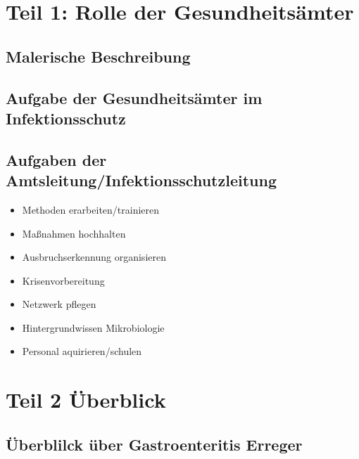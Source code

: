 \documentclass[
]{article}
\providecommand{\tightlist}{%
  \setlength{\itemsep}{0pt}\setlength{\parskip}{0pt}}
\begin{document}
\hypertarget{teil-1-rolle-der-gesundheitsuxe4mter}{%
\section{Teil 1: Rolle der
Gesundheitsämter}\label{teil-1-rolle-der-gesundheitsuxe4mter}}

\hypertarget{malerische-beschreibung}{%
\subsection{Malerische Beschreibung}\label{malerische-beschreibung}}

\hypertarget{aufgabe-der-gesundheitsuxe4mter-im-infektionsschutz}{%
\subsection{Aufgabe der Gesundheitsämter im
Infektionsschutz}\label{aufgabe-der-gesundheitsuxe4mter-im-infektionsschutz}}

\hypertarget{aufgaben-der-amtsleitunginfektionsschutzleitung}{%
\subsection{Aufgaben der
Amtsleitung/Infektionsschutzleitung}\label{aufgaben-der-amtsleitunginfektionsschutzleitung}}

\begin{itemize}
\tightlist
\item
  Methoden erarbeiten/trainieren
\item
  Maßnahmen hochhalten
\item
  Ausbruchserkennung organisieren
\item
  Krisenvorbereitung
\item
  Netzwerk pflegen
\item
  Hintergrundwissen Mikrobiologie
\item
  Personal aquirieren/schulen
\end{itemize}

\hypertarget{teil-2-uxfcberblick}{%
\section{Teil 2 Überblick}\label{teil-2-uxfcberblick}}

\hypertarget{uxfcberblilck-uxfcber-gastroenteritis-erreger}{%
\subsection{Überblilck über Gastroenteritis
Erreger}\label{uxfcberblilck-uxfcber-gastroenteritis-erreger}}
\end{document}
